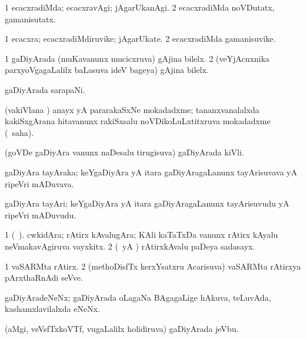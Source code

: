 \bentry
{} 
\gl{\kirxvi}
\expl{}
\bmng
\bnum
\num{1} ecacxradiMda; ecacxravAgi; jAgarUkanAgi. 
\num{2} ecacxradiMda noVDutatx, gamanisutatx. 
\enum
\emng
\eentry

\bentry
{} 
\gl{\nA}
\expl{}
\bmng
\bnum
\num{1} ecacxra; ecacxradiMdiruvike; jAgarUkate. 
\num{2} ecacxradiMda gamanisuvike. 
\enum
\emng
\eentry

\bentry
{} 
\gl{\nA}
\expl{}
\bmng
\bnum
\num{1} gaDiyArada (muKavanunx mucicxruva) gAjina bilelx. 
\num{2} (veYjAcnxnika parxyoVgagaLalilx baLasuva ideV bageya) gAjina bilelx. 
\enum
\emng
\eentry

\bentry
{} 
\gl{\nA}
\expl{}
\bmng
gaDiyArada sarapaNi. 
\emng
\eentry

\bentry
{} 
\gl{\nA}
\expl{}
\bmng
(vakiVlana \vi) anayx yA pararakaSxNe mokadadxme; tananxvanalalxda kakiSxgArana hitavanunx rakiSxsalu noVDikoLuLxtitxruva mokadadxme (\rUpa\ saha). 
\emng
\eentry

\bentry
{} 
\gl{\nA}
\expl{}
\bmng
(goVDe gaDiyAra \mo vanunx naDesalu tirugisuva) gaDiyArada kiVli. 
\emng
\eentry

\bentry
{} 
\gl{\nA}
\expl{}
\bmng
gaDiyAra tayAraka; keYgaDiyAra yA itara gaDiyAragaLanunx tayArisuvava yA ripeVri mADuvava. 
\emng
\eentry

\bentry
{} 
\gl{\nA}
\expl{}
\bmng
gaDiyAra tayAri; keYgaDiyAra yA itara gaDiyAragaLanunx tayArisuvudu yA ripeVri mADuvudu. 
\emng
\eentry

\bentry
{} 
\gl{\nA}
\expl{}
\bmng
\bnum
\num{1} (\bava\ ). cwkidAra; rAtirx kAvalugAra; KAli kaTaTxDa \mo vanunx rAtirx kAyalu neVmakavAgiruva vayxkitx. 
\num{2} (\pArxparx\ yA \ca) rAtirxkAvalu paDeya sadasayx. 
\enum
\emng
\eentry

\bentry
{} 
\gl{\nA}
\expl{}
\bmng
\bnum
\num{1} vaSARMta rAtirx. 
\num{2} (methoDisfTx kerxYsatxru Acarisuva) vaSARMta rAtirxya pArxthaRnAdi seVve. 
\enum
\emng
\eentry

\bentry
{} 
\gl{\nA}
\expl{}
\bmng
gaDiyAradeNeNx; gaDiyArada oLagaNa BAgagaLige hAkuva, teLuvAda, kashamxlavilalxda eNeNx. 
\emng
\eentry

\bentry
{} 
\gl{\nA}
\expl{}
\bmng
(aMgi, veVsfTxkoVTf, \mo vugaLalilx holidiruva) gaDiyArada jeVbu. 
\emng
\eentry


